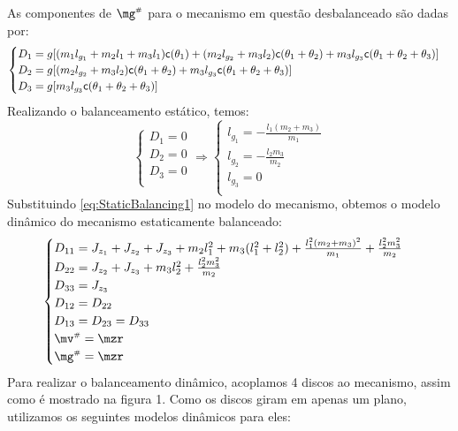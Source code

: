 \documentclass[a4paper,11pt,brazil,fleqn]{article}
\begin{document}
As componentes de $\mg\ssh$ para o mecanismo em quest\~{a}o desbalanceado s\~{a}o dadas por:
\begin{equation}\label{eq:gh1}
\begin{cases}
D_1 = g[ (m_1 l_{g_1} + m_2 l_1 + m_3 l_1 ) \mathsf{c}(\theta_1) + (m_2 l_{g_2} + m_3 l_2) \mathsf{c}(\theta_1 + \theta_2) + m_3 l_{g_3} \mathsf{c}(\theta_1 + \theta_2 + \theta_3) ] \\
D_2 = g[  (m_2 l_{g_2} + m_3 l_2) \mathsf{c}(\theta_1 + \theta_2) + m_3 l_{g_3} \mathsf{c}(\theta_1 + \theta_2 + \theta_3) ] \\
D_3 = g[   m_3 l_{g_3} \mathsf{c}(\theta_1 + \theta_2 + \theta_3) ] \\
\end{cases}
\end{equation} 
Realizando o balanceamento est\'{a}tico, temos:
\begin{equation}\label{eq:StaticBalancing1}
\begin{cases}
D_1 = 0 \\
D_2 = 0 \\
D_3 = 0 \\
\end{cases}
\Rightarrow
\begin{cases}
l_{g_1} = -\frac{l_1(m_2 + m_3)}{m_1} \\
l_{g_2} = -\frac{l_2 m_3}{m_2} \\
l_{g_3} = 0 \\
\end{cases}
\end{equation}
Substituindo \eqref{eq:StaticBalancing1} no modelo do mecanismo, obtemos o modelo din\^{a}mico do mecanismo estaticamente balanceado:
\begin{equation}\label{eq:StaticBalanced1}
\begin{cases}
D_{11} = J_{z_1} + J_{z_2} + J_{z_3} + m_2 l_1^2 + m_3 (l_1^2 + l_2^2) + \frac{l_1^2 (m_2 + m_3)^2}{m_1} + \frac{l_2^2 m_3^2}{m_2} \\
D_{22} = J_{z_2} + J_{z_3} + m_3 l_2^2 + \frac{l_2^2 m_3^2}{m_2} \\
D_{33} = J_{z_3} \\
D_{12} = D_{22} \\
D_{13} = D_{23} = D_{33} \\
\mv\ssh = \mzr \\
\mg\ssh = \mzr
\end{cases}
\end{equation}
Para realizar o balanceamento din\^{a}mico, acoplamos 4 discos ao mecanismo, assim como \'{e} mostrado na figura 1. Como os discos giram em apenas um plano, utilizamos os seguintes modelos din\^{a}micos para eles:
\end{document}
